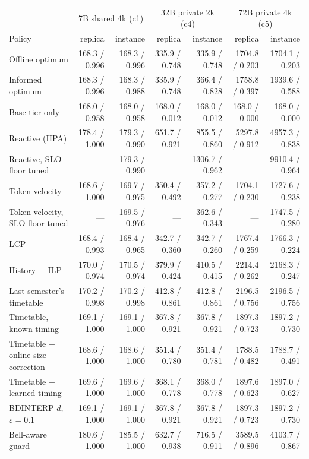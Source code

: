 \begin{tabular}{@{}lrrrrrr@{}}
\toprule
& \multicolumn{2}{c}{7B shared 4k (c1)} & \multicolumn{2}{c}{32B private 2k (c4)} & \multicolumn{2}{c}{72B private 4k (c5)} \\
Policy & replica & instance & replica & instance & replica & instance \\
\midrule
Offline optimum & 168.3 / 0.996 & 168.3 / 0.996 & 335.9 / 0.748 & 335.9 / 0.748 & 1704.8 / 0.203 & 1704.1 / 0.203 \\
Informed optimum & 168.3 / 0.996 & 168.3 / 0.988 & 335.9 / 0.748 & 366.4 / 0.828 & 1758.8 / 0.397 & 1939.6 / 0.588 \\
Base tier only & 168.0 / 0.958 & 168.0 / 0.958 & 168.0 / 0.012 & 168.0 / 0.012 & 168.0 / 0.000 & 168.0 / 0.000 \\
Reactive (HPA) & 178.4 / 1.000 & 179.3 / 0.990 & 651.7 / 0.921 & 855.5 / 0.860 & 5297.8 / 0.912 & 4957.3 / 0.838 \\
Reactive, SLO-floor tuned & --- & 179.3 / 0.990 & --- & 1306.7 / 0.962 & --- & 9910.4 / 0.964 \\
Token velocity & 168.6 / 1.000 & 169.7 / 0.975 & 350.4 / 0.492 & 357.2 / 0.277 & 1704.1 / 0.230 & 1727.6 / 0.238 \\
Token velocity, SLO-floor tuned & --- & 169.5 / 0.976 & --- & 362.6 / 0.343 & --- & 1747.5 / 0.280 \\
LCP & 168.4 / 0.993 & 168.4 / 0.965 & 342.7 / 0.360 & 342.7 / 0.260 & 1767.4 / 0.259 & 1766.3 / 0.224 \\
History + ILP & 170.0 / 0.974 & 170.5 / 0.974 & 379.9 / 0.424 & 410.5 / 0.415 & 2214.4 / 0.262 & 2168.3 / 0.247 \\
Last semester's timetable & 170.2 / 0.998 & 170.2 / 0.998 & 412.8 / 0.861 & 412.8 / 0.861 & 2196.5 / 0.756 & 2196.5 / 0.756 \\
Timetable, known timing & 169.1 / 1.000 & 169.1 / 1.000 & 367.8 / 0.921 & 367.8 / 0.921 & 1897.3 / 0.723 & 1897.2 / 0.730 \\
Timetable + online size correction & 168.6 / 1.000 & 168.6 / 1.000 & 351.4 / 0.780 & 351.4 / 0.781 & 1788.5 / 0.482 & 1788.7 / 0.491 \\
Timetable + learned timing & 169.6 / 1.000 & 169.6 / 1.000 & 368.1 / 0.778 & 368.0 / 0.778 & 1897.6 / 0.623 & 1897.0 / 0.627 \\
BDINTERP-$d$, $\varepsilon=0.1$ & 169.1 / 1.000 & 169.1 / 1.000 & 367.8 / 0.921 & 367.8 / 0.921 & 1897.3 / 0.723 & 1897.2 / 0.730 \\
Bell-aware guard & 180.6 / 1.000 & 185.5 / 1.000 & 632.7 / 0.938 & 716.5 / 0.911 & 3589.5 / 0.896 & 4103.7 / 0.867 \\
\bottomrule
\end{tabular}
